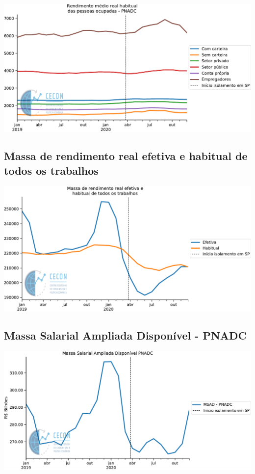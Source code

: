 \documentclass{SelfArx}
\begin{document}
\begin{center}
\includegraphics[width=.9\linewidth]{./figs/Emprego/RMHPO.pdf}
\end{center}

\subsection*{Massa de rendimento real efetiva e habitual de todos os trabalhos}
\label{sec:org96d2e68}

\begin{center}
\includegraphics[width=.9\linewidth]{./figs/Emprego/MRR_Efetiva_Habitual.pdf}
\end{center}

\subsection*{Massa Salarial Ampliada Disponível - PNADC}
\label{sec:orgb684d47}

\begin{center}
\includegraphics[width=.9\linewidth]{./figs/Emprego/MSAD.pdf}
\end{center}
\end{document}
